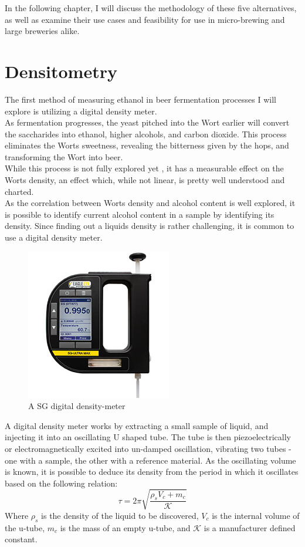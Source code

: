 \documentclass[twoside]{ctuthesis}
\theoremstyle{plain}
\theoremstyle{definition}
\theoremstyle{note}
\begin{document}
In the following chapter, I will discuss the methodology of these five alternatives, as well as examine their use cases and feasibility for use in micro-brewing and large breweries alike.\\

\newpage

\section{Densitometry}
The first method of measuring ethanol in beer fermentation processes I will explore is utilizing a digital density meter.\\
As fermentation progresses, the yeast pitched into the Wort earlier will convert the saccharides into ethanol, higher alcohols, and carbon dioxide. This process eliminates the Worts sweetness, revealing the bitterness given by the hops, and transforming the Wort into beer. \\
While this process is not fully explored yet \cite{Brewing_Science}, it has a measurable effect on the Worts density, an effect which, while not linear, is pretty well understood and charted.\\
As the correlation between Worts density and alcohol content is well explored, it is possible to identify current alcohol content in a sample by identifying its density. Since finding out a liquids density is rather challenging, it is common to use a digital density meter\cite{Ethanol_Measurement}.\\

\begin{figure}[H]
	\centering
	\includegraphics[scale = 0.6]{sg-ultra-max-digital-densitymeter-d}
	\caption{A SG digital density-meter}
\end{figure}

A digital density meter works by extracting a small sample of liquid, and injecting it into an oscillating U shaped tube. The tube is then piezoelectrically or electromagnetically excited into un-damped oscillation, vibrating two tubes - one with a sample, the other with a reference material. As the oscillating volume is known, it is possible to deduce its density from the period in which it oscillates based on the following relation:
\begin{equation}
	\tau = 2\pi \sqrt{\frac{\rho_sV_c+m_c}{\mathcal{K}}}
\end{equation}
Where $\rho_s$ is the density of the liquid to be discovered, $V_c$ is the internal volume of the u-tube, $m_c$ is the mass of an empty u-tube, and $\mathcal{K}$ is a manufacturer defined constant.\\
\end{document}
